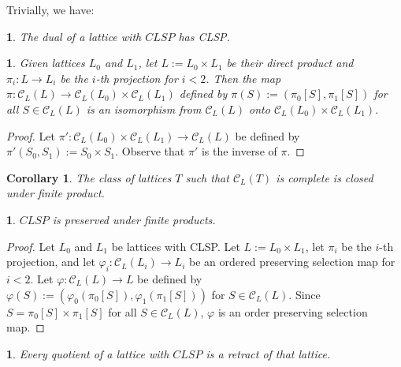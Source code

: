 \documentclass[12pt]{amsart}
\newtheorem{corollary}[definition]{{\bf Corollary}}
\newtheorem{proposition}[definition]{\noindent {\bf Proposition}}
\begin{document}
Trivially, we have:

\begin{proposition}
The dual of a lattice with  $CLSP$ has  CLSP.
\end{proposition}

\begin{proposition} 
Given lattices $L_0$ and $L_1$, let $L:=L_0\times L_1$ be their direct
product and $\pi_i:L\rightarrow L_i$ be the $i$-th projection for
$i<2$. Then the map $\pi: \mathcal{C}_{ L}(L)\rightarrow \mathcal{C}_{
L}(L_0)\times \mathcal{C}_{ L}(L_1)$ defined by $\pi(S):=( \pi_0[S],
\pi_1[S])$ for all $S\in \mathcal{C}_{ L}(L)$ is an isomorphism from
$\mathcal{C}_{ L}(L)$ onto $\mathcal{C}_{ L}(L_0)\times \mathcal{C}_{
L}(L_1)$.
\end{proposition}

\begin{proof} 
Let $\pi':\mathcal{C}_{L}(L_0)\times \mathcal{C}_{ L}(L_1)\rightarrow
\mathcal{C}_{ L}(L)$ be defined by $\pi'(S_0, S_1):= S_0\times
S_1$. Observe that $\pi'$ is the inverse of $\pi$. \end{proof}

\begin{corollary} \label{cor:finiteproduct}
The class of lattices $T$ such that $\mathcal{C}_{ L}(T)$ is complete
is closed under finite product.\\
\end{corollary}

\begin{proposition} \label{lem:CLSPproduct} 
$CLSP$ is preserved under finite products.  
\end{proposition}

\begin{proof}
Let $L_0$ and $L_1$ be lattices with CLSP. Let $L:=L_0\times L_1$, let
$\pi_i$ be the $i$-th projection, and let $\varphi_i: \mathcal{C}_{
L}(L_i) \rightarrow L_i$ be an ordered preserving selection map for
$i<2$.  Let $\varphi: \mathcal{C}_{ L}(L)\rightarrow L$ be defined by
$\varphi(S):= (\varphi_0(\pi_0[S]), \varphi_1(\pi_1[S]))$ for $S\in
\mathcal{C}_{ L}(L)$. Since $S=\pi_0[S]\times \pi_1[S]$ for all $S\in
\mathcal{C}_{ L}(L)$, $\varphi$ is an order preserving selection map.
\end{proof}

\begin{proposition} \label{lem:quotient-retract} 
Every quotient of a lattice with $CLSP$ is a retract of that
lattice. \end{proposition}
\end{document}
